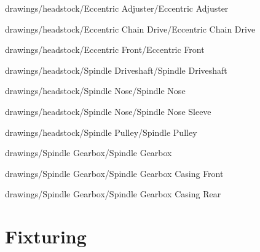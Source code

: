 
            {drawings/headstock/Eccentric Adjuster/Eccentric Adjuster}


            {drawings/headstock/Eccentric Chain Drive/Eccentric Chain Drive}


            {drawings/headstock/Eccentric Front/Eccentric Front}


            {drawings/headstock/Spindle Driveshaft/Spindle Driveshaft}


            {drawings/headstock/Spindle Nose/Spindle Nose}


            {drawings/headstock/Spindle Nose/Spindle Nose Sleeve}
			

            {drawings/headstock/Spindle Pulley/Spindle Pulley}


            {drawings/Spindle Gearbox/Spindle Gearbox}


            {drawings/Spindle Gearbox/Spindle Gearbox Casing Front}
	     

            {drawings/Spindle Gearbox/Spindle Gearbox Casing Rear}
	     
	     
\section{Fixturing}

